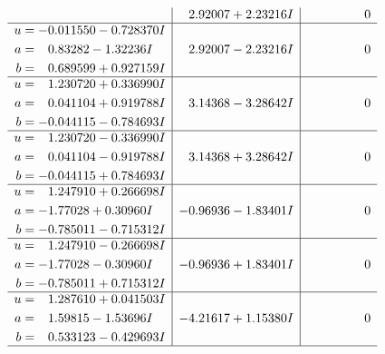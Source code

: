 \documentclass[1p]{elsarticle_modified}
\theoremstyle{definition}
\begin{document}
$$\begin{array}{c|c|c}
 & \phantom{-}2.92007 + 2.23216 I & \phantom{-0.000000 } 0 \\ \hline\begin{aligned}
u &= -0.011550 - 0.728370 I \\
a &= \phantom{-}0.83282 - 1.32236 I \\
b &= \phantom{-}0.689599 + 0.927159 I\end{aligned}
 & \phantom{-}2.92007 - 2.23216 I & \phantom{-0.000000 } 0 \\ \hline\begin{aligned}
u &= \phantom{-}1.230720 + 0.336990 I \\
a &= \phantom{-}0.041104 + 0.919788 I \\
b &= -0.044115 - 0.784693 I\end{aligned}
 & \phantom{-}3.14368 - 3.28642 I & \phantom{-0.000000 } 0 \\ \hline\begin{aligned}
u &= \phantom{-}1.230720 - 0.336990 I \\
a &= \phantom{-}0.041104 - 0.919788 I \\
b &= -0.044115 + 0.784693 I\end{aligned}
 & \phantom{-}3.14368 + 3.28642 I & \phantom{-0.000000 } 0 \\ \hline\begin{aligned}
u &= \phantom{-}1.247910 + 0.266698 I \\
a &= -1.77028 + 0.30960 I \\
b &= -0.785011 - 0.715312 I\end{aligned}
 & -0.96936 - 1.83401 I & \phantom{-0.000000 } 0 \\ \hline\begin{aligned}
u &= \phantom{-}1.247910 - 0.266698 I \\
a &= -1.77028 - 0.30960 I \\
b &= -0.785011 + 0.715312 I\end{aligned}
 & -0.96936 + 1.83401 I & \phantom{-0.000000 } 0 \\ \hline\begin{aligned}
u &= \phantom{-}1.287610 + 0.041503 I \\
a &= \phantom{-}1.59815 - 1.53696 I \\
b &= \phantom{-}0.533123 - 0.429693 I\end{aligned}
 & -4.21617 + 1.15380 I & \phantom{-0.000000 } 0\\
 \hline 
 \end{array}$$\newpage$$\begin{array}{c|c|c}  

\end{array}$$
\end{document}
